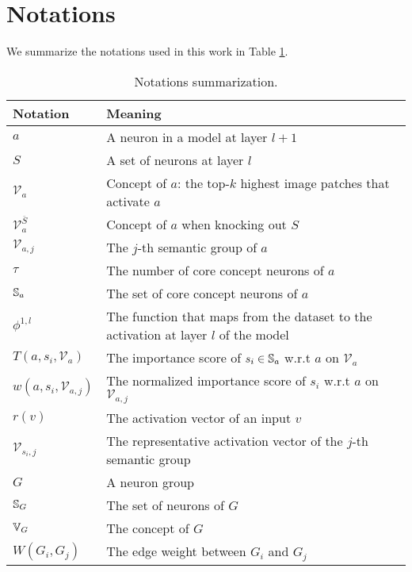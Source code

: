\section{Notations}
We summarize the notations used in this work in Table \ref{fig:notation}.
\label{sec:appendix_notation}
\begin{table}[htb]
\caption{Notations summarization.} \label{fig:notation}
\centering
\begin{tabular}{|l|l|}
\hline
Notation & Meaning \\ \hline
$a$ & A neuron in a model at layer $l+1$ \\ \hline
$S$ & A set of neurons at layer $l$ \\ \hline
$\mathcal{V}_a$ & Concept of $a$: the top-$k$ highest image patches that activate $a$ \\ \hline
$\mathcal{V}^{\overline{S}}_{a}$  & Concept of $a$ when knocking out $S$ \\ \hline
$\mathcal{V}_{a, j}$ & The $j$-th semantic group of $a$ \\ \hline
$\tau$  & The number of core concept neurons of $a$ \\ \hline
${\mathbb{S}}_a$  & The set of core concept neurons of $a$        \\ \hline
$\phi^{1, l}$  & The function that maps from the dataset to the activation at layer $l$ of the model \\ \hline
$T(a, s_i, \mathcal{V}_a)$  & The importance score of $s_i \in {\mathbb{S}}_a$ w.r.t $a$ on $\mathcal{V}_a$    \\ \hline
$w(a, s_i, \mathcal{V}_{a, j})$ & The normalized importance score of $s_i$ w.r.t $a$ on $\mathcal{V}_{a, j}$ \\ \hline
$r(v)$ & The activation vector of an input $v$  \\ \hline
$\mathcal{V}_{s_i, j}$ & The representative activation vector of the $j$-th semantic group  \\ \hline
$G$ & A neuron group \\ \hline
${\mathbb{S}}_G$ & The set of neurons of $G$ \\ \hline
${\mathbb{V}}_G$ & The concept of $G$ \\ \hline
$W(G_i, G_j)$ & The edge weight between $G_i$ and $G_j$ \\ \hline
\end{tabular}
\end{table}

